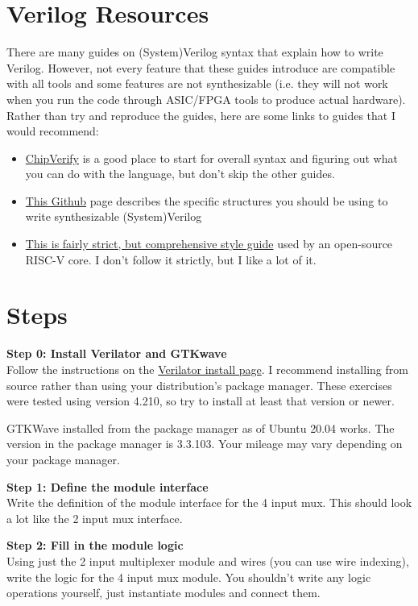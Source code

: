 \documentclass{article}
\begin{document}
\section*{Verilog Resources}
There are many guides on (System)Verilog syntax that explain how to write Verilog. However, not every feature that these guides introduce are compatible with all tools and some features are not synthesizable (i.e. they will not work when you run the code through ASIC/FPGA tools to produce actual hardware). Rather than try and reproduce the guides, here are some links to guides that I would recommend:
\begin{itemize}
    \item \hyperlink{https://www.chipverify.com}{ChipVerify} is a good place to start for overall syntax and figuring out what you can do with the language, but don't skip the other guides.
    \item \hyperlink{https://github.com/sifferman/labs-with-cva6/blob/main/guides/synthesis.md}{This Github} page describes the specific structures you should be using to write synthesizable (System)Verilog
    \item \hyperlink{https://github.com/lowRISC/style-guides/blob/master/VerilogCodingStyle.md}{This is fairly strict, but comprehensive style guide} used by an open-source RISC-V core. I don't follow it strictly, but I like a lot of it.
\end{itemize}

\section*{Steps}
\textbf{Step 0: Install Verilator and GTKwave}\\
Follow the instructions on the
\hyperlink{https://veripool.org/guide/latest/install.html}{Verilator install
page}. I recommend installing from source rather than using your distribution's
package manager. These exercises were tested using version 4.210, so try to
install at least that version or newer.

GTKWave installed from the package manager as of Ubuntu 20.04 works. The version
in the package manager is 3.3.103. Your mileage may vary depending on your
package manager.

\noindent\textbf{Step 1: Define the module interface}\\
Write the definition of the module interface for the 4 input mux. This should
look a lot like the 2 input mux interface.


\noindent\textbf{Step 2: Fill in the module logic}\\
Using just the 2 input multiplexer module and wires (you can use wire indexing),
write the logic for the 4 input mux module. You shouldn't write any
logic operations yourself, just instantiate modules and connect them.
\end{document}
